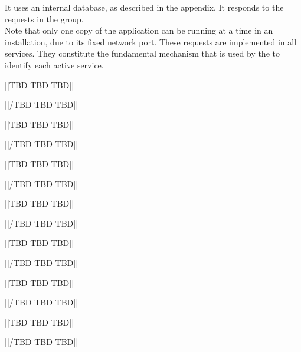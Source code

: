 It uses an internal database, as described in the
 appendix.
It responds to the requests in the
 group.\\

Note that only one copy of the  application can be
running at a time in an \mplusm{} installation, due to its fixed \yarp{} network port.
\secondaryEnd{}
These requests are implemented in all \mplusm{} services.
They constitute the fundamental mechanism that is used by the
 to identify each active service.

			||TBD TBD TBD||

			||/TBD TBD TBD||


			||TBD TBD TBD||

			||/TBD TBD TBD||


			||TBD TBD TBD||

			||/TBD TBD TBD||


			||TBD TBD TBD||

			||/TBD TBD TBD||


			||TBD TBD TBD||

			||/TBD TBD TBD||


			||TBD TBD TBD||

			||/TBD TBD TBD||


			||TBD TBD TBD||

			||/TBD TBD TBD||

